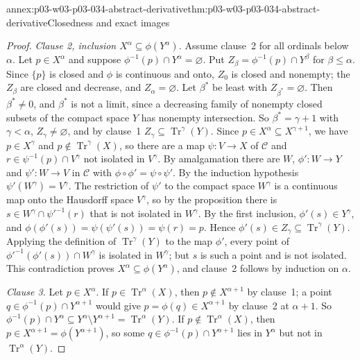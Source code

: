 \begin{annexitem}{annex:p03-w03-p03-034-abstract-derivative}{thm:p03-w03-p03-034-abstract-derivative}{Closedness and exact images}
\begin{proof}
\emph{Clause 2, inclusion \(X^\alpha\subseteq\phi(Y^\alpha)\).} Assume
clause~2 for all ordinals below \(\alpha\). Let \(p\in X^\alpha\) and
suppose \(\phi^{-1}(p)\cap Y^\alpha=\varnothing\). Put
\(Z_\beta=\phi^{-1}(p)\cap Y^\beta\) for \(\beta\leq\alpha\). Since
\(\{p\}\) is closed and \(\phi\) is continuous and onto, \(Z_0\) is closed
and nonempty; the \(Z_\beta\) are closed and decrease, and
\(Z_\alpha=\varnothing\). Let \(\beta^*\) be least with
\(Z_{\beta^*}=\varnothing\). Then \(\beta^*\neq0\), and \(\beta^*\) is not
a limit, since a decreasing family of nonempty closed subsets of the
compact space \(Y\) has nonempty intersection. So \(\beta^*=\gamma+1\)
with \(\gamma<\alpha\), \(Z_\gamma\neq\varnothing\), and by clause~1
\(Z_\gamma\subseteq\operatorname{Tr}^\gamma(Y)\). Since
\(p\in X^\alpha\subseteq X^{\gamma+1}\), we have \(p\in X^\gamma\) and
\(p\notin\operatorname{Tr}^\gamma(X)\), so there are a map
\(\psi:V\to X\) of \(\mathcal C\) and \(r\in\psi^{-1}(p)\cap V^\gamma\)
not isolated in \(V^\gamma\). By amalgamation there are \(W\),
\(\phi':W\to Y\) and \(\psi':W\to V\) in \(\mathcal C\) with
\(\phi\circ\phi'=\psi\circ\psi'\). By the induction hypothesis
\(\psi'(W^\gamma)=V^\gamma\). The restriction of \(\psi'\) to the compact
space \(W^\gamma\) is a continuous map onto the Hausdorff space
\(V^\gamma\), so by the proposition there is
\(s\in W^\gamma\cap\psi'^{-1}(r)\) that is not isolated in \(W^\gamma\).
By the first inclusion, \(\phi'(s)\in Y^\gamma\), and
\(\phi(\phi'(s))=\psi(\psi'(s))=\psi(r)=p\). Hence
\(\phi'(s)\in Z_\gamma\subseteq\operatorname{Tr}^\gamma(Y)\). Applying the
definition of \(\operatorname{Tr}^\gamma(Y)\) to the map \(\phi'\), every
point of \(\phi'^{-1}(\phi'(s))\cap W^\gamma\) is isolated in
\(W^\gamma\); but \(s\) is such a point and is not isolated. This
contradiction proves \(X^\alpha\subseteq\phi(Y^\alpha)\), and clause~2
follows by induction on \(\alpha\).

\emph{Clause 3.} Let \(p\in X^\alpha\). If
\(p\in\operatorname{Tr}^\alpha(X)\), then \(p\notin X^{\alpha+1}\) by
clause~1; a point \(q\in\phi^{-1}(p)\cap Y^{\alpha+1}\) would give
\(p=\phi(q)\in X^{\alpha+1}\) by clause~2 at \(\alpha+1\). So
\(\phi^{-1}(p)\cap Y^\alpha\subseteq Y^\alpha\setminus Y^{\alpha+1}
=\operatorname{Tr}^\alpha(Y)\). If \(p\notin\operatorname{Tr}^\alpha(X)\),
then \(p\in X^{\alpha+1}=\phi(Y^{\alpha+1})\), so some
\(q\in\phi^{-1}(p)\cap Y^{\alpha+1}\) lies in \(Y^\alpha\) but not in
\(\operatorname{Tr}^\alpha(Y)\).
\end{proof}
\end{annexitem}

